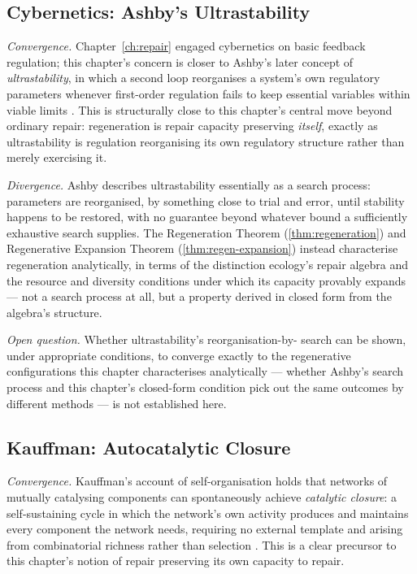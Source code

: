 \documentclass[12pt,twoside,openright]{book}
\begin{document}
\subsection*{Cybernetics: Ashby's Ultrastability}

\emph{Convergence.} Chapter~\ref{ch:repair} engaged cybernetics
on basic feedback regulation; this chapter's concern is closer
to Ashby's later concept of \emph{ultrastability}, in which a
second loop reorganises a system's own regulatory parameters
whenever first-order regulation fails to keep essential
variables within viable limits \parencite{ashby1956}. This is
structurally close to this chapter's central move beyond
ordinary repair: regeneration is repair capacity preserving
\emph{itself}, exactly as ultrastability is regulation
reorganising its own regulatory structure rather than merely
exercising it.

\emph{Divergence.} Ashby describes ultrastability essentially as
a search process: parameters are reorganised, by something close
to trial and error, until stability happens to be restored, with
no guarantee beyond whatever bound a sufficiently exhaustive
search supplies. The Regeneration Theorem
(\cref{thm:regeneration}) and Regenerative Expansion Theorem
(\cref{thm:regen-expansion}) instead characterise regeneration
analytically, in terms of the distinction ecology's repair
algebra and the resource and diversity conditions under which
its capacity provably expands --- not a search process at all,
but a property derived in closed form from the algebra's
structure.

\emph{Open question.} Whether ultrastability's reorganisation-by-
search can be shown, under appropriate conditions, to converge
exactly to the regenerative configurations this chapter
characterises analytically --- whether Ashby's search process
and this chapter's closed-form condition pick out the same
outcomes by different methods --- is not established here.

\subsection*{Kauffman: Autocatalytic Closure}

\emph{Convergence.} Kauffman's account of self-organisation
holds that networks of mutually catalysing components can
spontaneously achieve \emph{catalytic closure}: a self-sustaining
cycle in which the network's own activity produces and maintains
every component the network needs, requiring no external
template and arising from combinatorial richness rather than
selection \parencite{kauffman1993}. This is a clear precursor to
this chapter's notion of repair preserving its own capacity to
repair.
\end{document}

